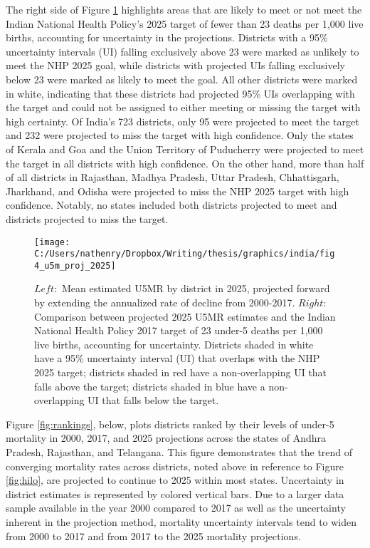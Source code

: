 \documentclass[
]{article}
\begin{document}
The right side of Figure \ref{fig:projections} highlights areas that are likely to meet or not meet the Indian National Health Policy's 2025 target of fewer than 23 deaths per 1,000 live births, accounting for uncertainty in the projections. Districts with a 95\% uncertainty intervals (UI) falling exclusively above 23 were marked as unlikely to meet the NHP 2025 goal, while districts with projected UIs falling exclusively below 23 were marked as likely to meet the goal. All other districts were marked in white, indicating that these districts had projected 95\% UIs overlapping with the target and could not be assigned to either meeting or missing the target with high certainty. Of India's 723 districts, only 95 were projected to meet the target and 232 were projected to miss the target with high confidence. Only the states of Kerala and Goa and the Union Territory of Puducherry were projected to meet the target in all districts with high confidence. On the other hand, more than half of all districts in Rajasthan, Madhya Pradesh, Uttar Pradesh, Chhattisgarh, Jharkhand, and Odisha were projected to miss the NHP 2025 target with high confidence. Notably, no states included both districts projected to meet and districts projected to miss the target.

\begin{figure}[!hbt]

{\centering \texttt{[image: C:/Users/nathenry/Dropbox/Writing/thesis/graphics/india/fig4\_u5m\_proj\_2025]} 

}

\caption{\(Left:\) Mean estimated U5MR by district in 2025, projected forward by extending the annualized rate of decline from 2000-2017. \(Right:\) Comparison between projected 2025 U5MR estimates and the Indian National Health Policy 2017 target of 23 under-5 deaths per 1,000 live births, accounting for uncertainty. Districts shaded in white have a 95\% uncertainty interval (UI) that overlaps with the NHP 2025 target; districts shaded in red have a non-overlapping UI that falls above the target; districts shaded in blue have a non-overlapping UI that falls below the target.}\label{fig:projections}
\end{figure}

Figure \ref{fig:rankings}, below, plots districts ranked by their levels of under-5 mortality in 2000, 2017, and 2025 projections across the states of Andhra Pradesh, Rajasthan, and Telangana. This figure demonstrates that the trend of converging mortality rates across districts, noted above in reference to Figure \ref{fig:hilo}, are projected to continue to 2025 within most states. Uncertainty in district estimates is represented by colored vertical bars. Due to a larger data sample available in the year 2000 compared to 2017 as well as the uncertainty inherent in the projection method, mortality uncertainty intervals tend to widen from 2000 to 2017 and from 2017 to the 2025 mortality projections.
\end{document}

